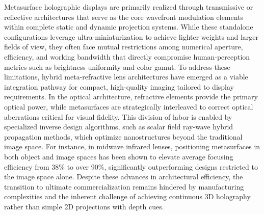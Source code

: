 \documentclass[11pt]{article}
\begin{document}
Metasurface holographic displays are primarily realized through transmissive or reflective architectures that serve as the core wavefront modulation elements within complete static and dynamic projection systems. While these standalone configurations leverage ultra-miniaturization to achieve lighter weights and larger fields of view, they often face mutual restrictions among numerical aperture, efficiency, and working bandwidth that directly compromise human-perception metrics such as brightness uniformity and color gamut. To address these limitations, hybrid meta-refractive lens architectures have emerged as a viable integration pathway for compact, high-quality imaging tailored to display requirements. In the optical architecture, refractive elements provide the primary optical power, while metasurfaces are strategically interleaved to correct optical aberrations critical for visual fidelity. This division of labor is enabled by specialized inverse design algorithms, such as scalar field ray-wave hybrid propagation methods, which optimize nanostructures beyond the traditional image space. For instance, in midwave infrared lenses, positioning metasurfaces in both object and image spaces has been shown to elevate average focusing efficiency from 38\% to over 90\%, significantly outperforming designs restricted to the image space alone. Despite these advances in architectural efficiency, the transition to ultimate commercialization remains hindered by manufacturing complexities and the inherent challenge of achieving continuous 3D holography rather than simple 2D projections with depth cues. \citep{doi_10_1515_nanoph_2025_0269_b999ce93} \citep{doi_10_1364_ao_516890_6221deea}
\end{document}
